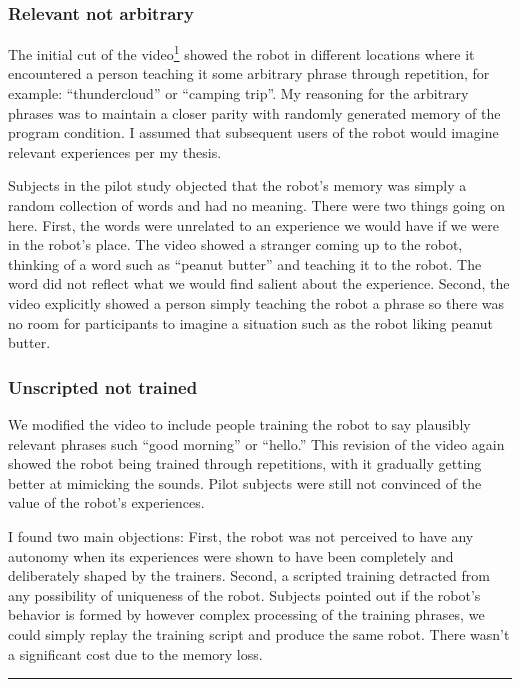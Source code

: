 \subsubsection{Relevant not arbitrary}
The initial cut of the video\footnote{Kate Darling helped with video shooting and with creating varying iterations of the robot's life story.} showed the robot in different locations where it encountered a person teaching it some arbitrary phrase through repetition, for example: ``thundercloud'' or ``camping trip''. My reasoning for the arbitrary phrases was to maintain a closer parity with randomly generated memory of the program condition. I assumed that subsequent users of the robot would imagine relevant experiences per my thesis. 

Subjects in the pilot study objected that the robot's memory was simply a random collection of words and had no meaning. There were two things going on here. First, the words were unrelated to an experience we would have if we were in the robot's place. The video showed a stranger coming up to the robot, thinking of a word such as ``peanut butter'' and teaching it to the robot. The word did not reflect what we would find salient about the experience. Second, the video explicitly showed a person simply teaching the robot a phrase so there was no room for participants to imagine a situation such as the robot liking peanut butter. 



\subsubsection{Unscripted not trained}
We modified the video to include people training the robot to say plausibly relevant phrases such ``good morning'' or ``hello.'' This revision of the video again showed the robot being trained through repetitions, with it gradually getting better at mimicking the sounds. Pilot subjects were still not convinced of the value of the robot's experiences. 

I found two main objections: First, the robot was not perceived to have any autonomy when its experiences were shown to have been completely and deliberately shaped by the trainers. Second, a scripted training detracted from any possibility of uniqueness of the robot. Subjects pointed out if the robot's behavior is formed by however complex processing of the training phrases, we could simply replay the training script and produce the same robot. There wasn't a significant cost due to the memory loss.

